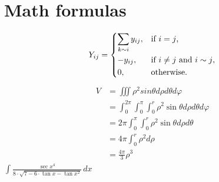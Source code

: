 \documentclass[10pt,a4paper]{report}
\begin{document}
\section{Math formulas}
\begin{align}
    Y_{ij} = \begin{dcases*}
        \sum_{k \sim i}y_{ij}, & if $ i = j $,\\
        {-y_{ij}}, & if $ i \ne j $ and $ i \sim j $,\\
        0, & otherwise. 
        \end{dcases*}
\end{align}
\begin{align}
    \begin{split}
      V &= \iiint \rho^{2} sin{\theta} d\rho d\theta d\varphi \\
      &= \int_{0}^{2\pi} \int_{0}^{\pi} \int_{0}^{r} \rho^{2} \sin{\theta} d\rho d\theta d\varphi \\
      &= 2\pi \int_{0}^{\pi} \int_{0}^{r} \rho^{2} \sin{\theta} d\rho d\theta \\
      &= 4\pi \int_{0}^{r} \rho^{2} d\rho \\
      &= \frac{4\pi}{3}\rho^{3}
    \end{split}
\end{align}
\begin{math}
\int{\frac{\sec{x}^4}{8 \cdot \sqrt{7 - 6 \cdot \tan{x} - \tan{x}^2}}\,dx}
\end{math}



  
\end{document}
